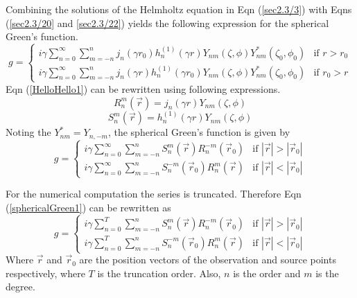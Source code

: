 Combining  the  solutions of the Helmholtz equation in Eqn (\ref{sec2.3/3}) with Eqns (\ref{sec2.3/20} and \ref{sec2.3/22}) yields the  following expression for the spherical Green's function. 
\begin{equation}
\label{HelloHello1}
g= \begin{cases}i\gamma \sum_{n=0}^{\infty}\sum_{m=-n}^{n}j_{n}(\gamma r_{0})h_{n}^{(1)}(\gamma r){Y_{nm}(\zeta,\phi)Y^{*}_{nm}(\zeta_{0},\phi_{0})}&\mbox{if } {r}>{r}_0\\
i\gamma \sum_{n=0}^{\infty}\sum_{m=-n}^{n}j_{n}(\gamma r)h_{n}^{(1)}(\gamma r_0){Y_{nm}(\zeta,\phi)Y^{*}_{nm}(\zeta_{0},\phi_{0})}&\mbox{if } {r}_0>{r}
\end{cases}
\end{equation} 
Eqn (\ref{HelloHello1}) can be rewritten  using following expressions.
\begin{equation}
R^{m}_{n}(\vec{r})= j_{n}{(\gamma r)} Y_{nm}(\zeta,\phi)
\end{equation}
\begin{equation}
S^{m}_{n}(\vec{r})= h_{n}^{(1)}{(\gamma r)} Y_{nm}(\zeta,\phi)
\end{equation}
Noting the $Y^{*}_{nm} =Y_{n,-m}$, the spherical Green's function is given by
\begin{equation}
\label{sphericalGreen1}
g= \begin{cases}i\gamma \sum_{n=0}^{\infty}\sum_{m=-n}^{n}S_{n}^{m}(\vec{r})R_{n}^{-m}(\vec {r}_0)&\mbox{if } |\vec{r}|>|\vec{r}_0|\\
i\gamma \sum_{n=0}^{\infty}\sum_{m=-n}^{n}S_{n}^{-m}(\vec{r}_0)R_{n}^{m}(\vec{r})&\mbox{if } |\vec{r}|<|\vec{r}_0|
\end{cases}
\end{equation} 
\par For the  numerical computation the series is   truncated. Therefore Eqn (\ref{sphericalGreen1}) can be rewritten as 
\begin{equation}
\label{sphericalGreenTrunc}
g= \begin{cases}i\gamma \sum_{n=0}^{T}\sum_{m=-n}^{n}S_{n}^{m}( \vec{r})R_{n}^{-m}(\vec{r}_0)&\mbox{if } |\vec{r}|>|\vec{r}_0|\\
i\gamma \sum_{n=0}^{T}\sum_{m=-n}^{n}S_{n}^{-m}( \vec{r}_0)R_{n}^{m}( \vec{r})&\mbox{if } |\vec{r}|<|\vec{r}_0|
\end{cases}
\end{equation}   
Where  $\vec{r}$ and $\vec{r}_0$ are the position vectors of the observation and source points respectively, where $T$ is the truncation order.  Also, $n$ is the order and $m $ is the degree. 
